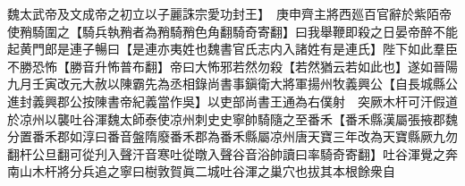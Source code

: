 魏太武帝及文成帝之初立以子麗誅宗愛功封王】　庚申齊主將西廵百官辭於紫陌帝使矟騎圍之【騎兵執矟者為矟騎矟色角翻騎奇寄翻】曰我舉鞭即殺之日晏帝醉不能起黄門郎是連子暢曰【是連亦夷姓也魏書官氏志内入諸姓有是連氏】陛下如此羣臣不勝恐怖【勝音升怖普布翻】帝曰大怖邪若然勿殺【若然猶云若如此也】遂如晉陽　九月壬寅改元大赦以陳霸先為丞相錄尚書事鎭衛大將軍揚州牧義興公【自長城縣公進封義興郡公按陳書帝紀義當作吳】以吏部尚書王通為右僕射　突厥木杆可汗假道於凉州以襲吐谷渾魏太師泰使凉州刺史史寧帥騎隨之至番禾【番禾縣漢屬張掖郡魏分置番禾郡如淳曰番音盤隋廢番禾郡為番禾縣屬凉州唐天寶三年改為天寶縣厥九勿翻杆公旦翻可從刋入聲汗音寒吐從暾入聲谷音浴帥讀曰率騎奇寄翻】吐谷渾覺之奔南山木杆將分兵追之寧曰樹敦賀眞二城吐谷渾之巢穴也拔其本根餘衆自